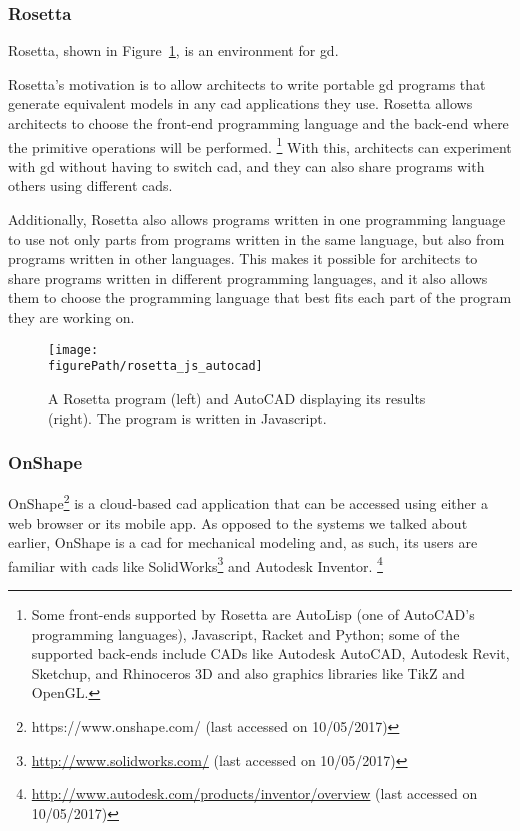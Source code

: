 \subsubsection{Rosetta}
\label{section:rosetta:related}
Rosetta\cite{de2012modern,lopes2011portable}, shown in Figure~\ref{fig:rosetta:ex}, is an environment for \gls{gd}.

Rosetta's motivation is to allow architects to write portable \gls{gd} programs that generate equivalent models in any \gls{cad} applications they use.
Rosetta allows architects to choose the front-end programming language and the back-end where the primitive operations will be performed\cite{de2012modern}.%
\footnote{Some front-ends supported by Rosetta are AutoLisp (one of AutoCAD's programming languages), Javascript, Racket and Python; some of the supported back-ends include CADs like Autodesk AutoCAD, Autodesk Revit, Sketchup, and Rhinoceros 3D and also graphics libraries like TikZ and OpenGL.}
With this, architects can experiment with \gls{gd} without having to switch \gls{cad}, and they can also share programs with others using different \glspl{cad}.

Additionally, Rosetta also allows programs written in one programming language to use not only parts from programs written in the same language, but also from programs written in other languages.
This makes it possible for architects to share programs written in different programming languages, and it also allows them to choose the programming language that best fits each part of the program they are working on.

\begin{figure}
	\centering
	\texttt{[image: \\figurePath/rosetta\_js\_autocad]}
	\caption{A Rosetta program (left) and AutoCAD displaying its results (right). The program is written in Javascript.}
	\label{fig:rosetta:ex}
\end{figure}


\subsubsection{OnShape}
OnShape\footnote{https://www.onshape.com/ (last accessed on 10/05/2017)} is a cloud-based \gls{cad} application that can be accessed using either a web browser or its mobile app.
As opposed to the systems we talked about earlier, OnShape is a \gls{cad} for mechanical modeling and, as such, its users are familiar with \glspl{cad} like SolidWorks\footnote{\url{http://www.solidworks.com/} (last accessed on 10/05/2017)} and Autodesk Inventor.%
\footnote{\url{http://www.autodesk.com/products/inventor/overview} (last accessed on 10/05/2017)}

